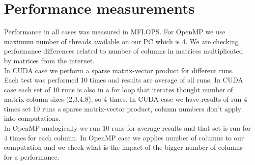 \documentclass{scrreprt}
\begin{document}
\chapter{Performance measurements}

Performance in all cases was measured in MFLOPS. 
For OpenMP we use maximum number of threads available on our PC which is 4. We are checking performance differences related to number of columns in matrices multiplicated by matrices from the internet.
\\
In CUDA case we perform a sparse matrix-vector product for different runs.
\\
Each test was performed 10 times and results are average of all runs. In CUDA case each set of 10 runs is also in a for loop that iterates thought number of matrix column sizes (2,3,4,8), so 4 times. In CUDA case we have results of run 4 times set 10 runs a sparse matrix-vector product, column numbers don't apply into computations. 
\\
In OpenMP analogically we run 10 runs for average results and that set is run for 4 times for each column. In OpenMP case we applies number of columns to our computation and we check what is the impact of the bigger number of columns for a performance.
\\
\\
\\
\\
\\
\\
\\
\\
\\
\\
\\
\\
\\
\\
\\
\\
\\
\\
\\
\\
\\
\\
\\
\\
\\
\\
\\
\\
\\
\\
\end{document}
